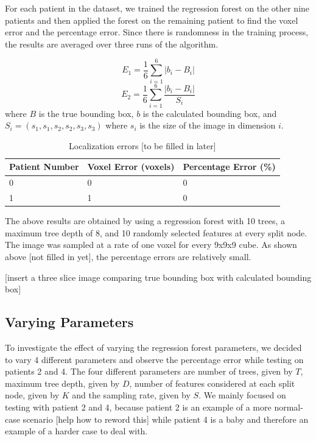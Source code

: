 For each patient in the dataset, we trained the regression forest on the other nine patients and then applied the forest on the remaining patient to find the voxel error and the percentage error. Since there is randomness in the training process, the results are averaged over three runs of the algorithm.

\begin{equation}
  E_1 = \frac{1}{6} \sum_{i=1} ^ {6} |b_i - B_i|
\end{equation}
\begin{equation}
  E_2 = \frac{1}{6} \sum_{i=1} ^ {6} \frac{|b_i - B_i|}{S_{i}}
\end{equation}
where $B$ is the true bounding box, $b$ is the calculated bounding box, and $S_i = (s_1, s_1, s_2, s_2, s_3, s_3)$ where $s_i$ is the size of the image in dimension $i$.

\begin{table}
  \caption{Localization errors [to be filled in later]}
  \label{tab:err}
  \begin{tabular}{p{2cm}p{2cm}p{2cm}}
    \toprule
    Patient Number & Voxel Error (voxels) & Percentage Error (\%) \\
    \midrule
    0 & 0 & 0\\
    1 & 1 & 0\\
    \bottomrule
  \end{tabular}
\end{table}

The above results are obtained by using a regression forest with 10 trees, a maximum tree depth of 8, and 10 randomly selected features at every split node. The image was sampled at a rate of one voxel for every 9x9x9 cube. As shown above [not filled in yet], the percentage errors are relatively small.

[insert a three slice image comparing true bounding box with calculated bounding box]

\subsection{Varying Parameters}

To investigate the effect of varying the regression forest parameters, we decided to vary 4 different parameters and observe the percentage error while testing on patients 2 and 4. The four different parameters are number of trees, given by $T$, maximum tree depth, given by $D$, number of features considered at each split node, given by $K$ and the sampling rate, given by $S$. We mainly focused on testing with patient 2 and 4, because patient 2 is an example of a more normal-case scenario [help how to reword this] while patient 4 is a baby and therefore an example of a harder case to deal with.
